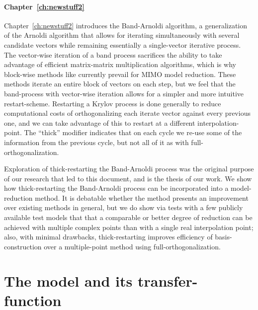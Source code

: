 \subsubsection{Chapter~\ref{ch:newstuff2}}
Chapter~\ref{ch:newstuff2} introduces the Band-Arnoldi algorithm, a generalization of the Arnoldi algorithm that allows for iterating simultaneously with several candidate vectors while remaining essentially a single-vector iterative process.   The vector-wise iteration of a band process sacrifices the ability to take advantage of efficient matrix-matrix multiplication algorithms, which is why block-wise methods like \cite{lehoucq1997block} currently prevail for MIMO model reduction.   These methods iterate an entire block of vectors on each step, but we feel that the band-process with vector-wise iteration allows for a simpler and more intuitive restart-scheme.   Restarting a Krylov process is done generally to reduce computational costs of orthogonalizing each iterate vector against every previous one, and we can take advantage of this to restart at a different interpolation-point.   The ``thick''  modifier indicates that on each cycle we re-use some of the information from the previous cycle, but not all of it as with full-orthogonalization.     

Exploration of thick-restarting the Band-Arnoldi process was the original purpose of our research that led to this document, and is the thesis of our work.      We show how thick-restarting the Band-Arnoldi process can be incorporated into a model-reduction method.  It is debatable whether the method presents an improvement over existing methods in general, but we do show via tests with a few publicly available test models that that a comparable or better degree of reduction can be achieved with multiple complex points than with a single real interpolation point; also, with minimal drawbacks,  thick-restarting improves efficiency of basis-construction over a multiple-point method using full-orthogonalization.   






\chapter{The model and its transfer-function}\label{ch:tfunc}
